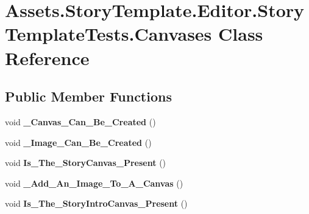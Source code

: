 \hypertarget{classAssets_1_1StoryTemplate_1_1Editor_1_1StoryTemplateTests_1_1Canvases}{}\section{Assets.\+Story\+Template.\+Editor.\+Story\+Template\+Tests.\+Canvases Class Reference}
\label{classAssets_1_1StoryTemplate_1_1Editor_1_1StoryTemplateTests_1_1Canvases}
\subsection*{Public Member Functions}
\begin{DoxyCompactItemize}
\item 
void {\bfseries \+\_\+\+Canvas\+\_\+\+Can\+\_\+\+Be\+\_\+\+Created} ()\hypertarget{classAssets_1_1StoryTemplate_1_1Editor_1_1StoryTemplateTests_1_1Canvases_afe72cef3713f3586d4c0f0eef2be0fdf}{}\label{classAssets_1_1StoryTemplate_1_1Editor_1_1StoryTemplateTests_1_1Canvases_afe72cef3713f3586d4c0f0eef2be0fdf}

\item 
void {\bfseries \+\_\+\+Image\+\_\+\+Can\+\_\+\+Be\+\_\+\+Created} ()\hypertarget{classAssets_1_1StoryTemplate_1_1Editor_1_1StoryTemplateTests_1_1Canvases_abb4c3efe6c23244ffe2d4fde6d7d14da}{}\label{classAssets_1_1StoryTemplate_1_1Editor_1_1StoryTemplateTests_1_1Canvases_abb4c3efe6c23244ffe2d4fde6d7d14da}

\item 
void {\bfseries Is\+\_\+\+The\+\_\+\+Story\+Canvas\+\_\+\+Present} ()\hypertarget{classAssets_1_1StoryTemplate_1_1Editor_1_1StoryTemplateTests_1_1Canvases_a3bd2612b46265162904de81c31f8240e}{}\label{classAssets_1_1StoryTemplate_1_1Editor_1_1StoryTemplateTests_1_1Canvases_a3bd2612b46265162904de81c31f8240e}

\item 
void {\bfseries \+\_\+\+Add\+\_\+\+An\+\_\+\+Image\+\_\+\+To\+\_\+\+A\+\_\+\+Canvas} ()\hypertarget{classAssets_1_1StoryTemplate_1_1Editor_1_1StoryTemplateTests_1_1Canvases_a61f4df6a0192c30f01329980db1d9194}{}\label{classAssets_1_1StoryTemplate_1_1Editor_1_1StoryTemplateTests_1_1Canvases_a61f4df6a0192c30f01329980db1d9194}

\item 
void {\bfseries Is\+\_\+\+The\+\_\+\+Story\+Intro\+Canvas\+\_\+\+Present} ()\hypertarget{classAssets_1_1StoryTemplate_1_1Editor_1_1StoryTemplateTests_1_1Canvases_aaff60388b5ce847c8ac929a57148fdf8}{}\label{classAssets_1_1StoryTemplate_1_1Editor_1_1StoryTemplateTests_1_1Canvases_aaff60388b5ce847c8ac929a57148fdf8}


\end{DoxyCompactItemize}
